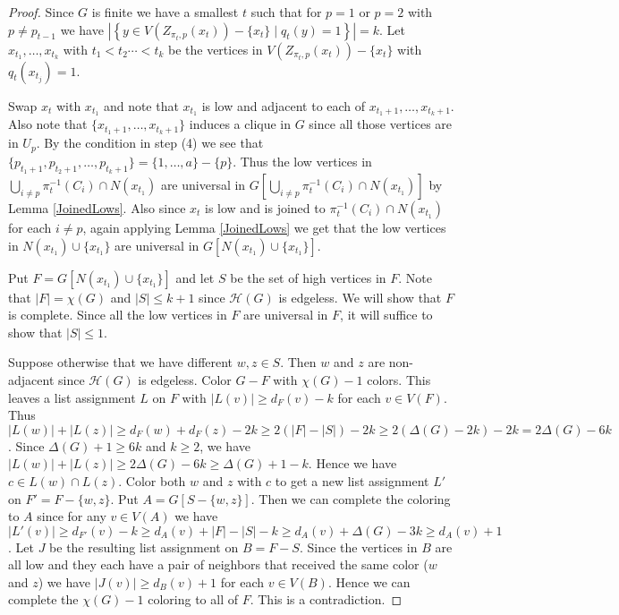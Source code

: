 \documentclass[12pt]{amsart}
\theoremstyle{plain}
\theoremstyle{definition}
\theoremstyle{remark}
\newcommand{\card}[1]{\left|#1\right|}
\begin{document}
\begin{proof}
Since $G$ is finite we have a smallest $t$ such that for $p = 1$ or $p = 2$ with $p \neq p_{t-1}$ we have $\left|\left\{y \in V(Z_{\pi_t, p}(x_t)) - \{x_t\} \mid q_t(y) = 1\right\}\right| = k$. Let $x_{t_1}, \ldots, x_{t_k}$  with $t_1 < t_2 \cdots < t_k$ be the vertices in $V(Z_{\pi_t, p}(x_t)) - \{x_t\}$ with $q_t(x_{t_j}) = 1$.

Swap $x_t$ with $x_{t_1}$ and note that $x_{t_1}$ is low and adjacent to each of $x_{t_1 + 1}, \ldots, x_{t_k + 1}$.  Also note that $\{x_{t_1 + 1}, \ldots, x_{t_k + 1}\}$ induces a clique in $G$ since all those vertices are in $U_p$. By the condition in step (4) we see that $\{p_{t_1 + 1}, p_{t_2 + 1}, \ldots, p_{t_k + 1}\} = \{1, \ldots, a\} - \{p\}$.  Thus the low vertices in $\bigcup_{i \neq p} \pi_t^{-1}(C_i) \cap N(x_{t_1})$ are universal in $G\left[\bigcup_{i \neq p} \pi_t^{-1}(C_i) \cap N(x_{t_1})\right]$ by Lemma \ref{JoinedLows}.  Also since $x_t$ is low and is joined to $\pi_t^{-1}(C_i)  \cap N(x_{t_1})$ for each $i \neq p$, again applying Lemma \ref{JoinedLows} we get that the low vertices in $N(x_{t_1}) \cup \{x_{t_1}\}$ are universal in $G[N(x_{t_1}) \cup \{x_{t_1}\}]$.

Put $F = G[N(x_{t_1}) \cup \{x_{t_1}\}]$ and let $S$ be the set of high vertices in $F$.  Note that $|F| = \chi(G)$ and $|S| \leq k + 1$ since $\mathcal{H}(G)$ is edgeless.  We will show that $F$ is complete.  Since all the low vertices in $F$ are universal in $F$, it will suffice to show that $\card{S} \leq 1$.  

Suppose otherwise that we have different $w, z \in S$.  Then $w$ and $z$ are non-adjacent since $\mathcal{H}(G)$ is edgeless.  Color $G - F$ with $\chi(G) - 1$ colors.  This leaves a list assignment $L$ on $F$ with $|L(v)| \geq d_F(v) - k$ for each $v \in V(F)$.  Thus $|L(w)| + |L(z)| \geq d_F(w) + d_F(z) - 2k \geq 2(|F| - |S|) - 2k \geq 2 (\Delta(G) - 2k) - 2k = 2\Delta(G) - 6k$.  Since $\Delta(G) + 1 \geq 6k$ and $k \geq 2$, we have $|L(w)| + |L(z)| \geq 2\Delta(G) - 6k \geq \Delta(G) + 1 - k$.  Hence we have $c \in L(w) \cap L(z)$.  Color both $w$ and $z$ with $c$ to get a new list assignment $L'$ on $F' = F - \{w, z\}$.  Put $A = G[S - \{w,z\}]$. Then we can complete the coloring to $A$ since for any $v \in V(A)$ we have $|L'(v)| \geq d_{F'}(v) - k \geq d_A(v) + |F| - |S| - k \geq d_A(v) + \Delta(G) - 3k \geq d_A(v) + 1$.  Let $J$ be the resulting list assignment on $B = F - S$.  Since the vertices in $B$ are all low and they each have a pair of neighbors that received the same color ($w$ and $z$) we have $|J(v)| \geq d_B(v) + 1$ for each $v \in V(B)$.  Hence we can complete the $\chi(G) - 1$ coloring to all of $F$.  This is a contradiction.
\end{proof}
\end{document}

